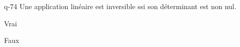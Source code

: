 \begin{truefalse}{q-74}
Une application linéaire est inversible ssi son déterminant est non nul.
\item Vrai
\item* Faux
\end{truefalse}

